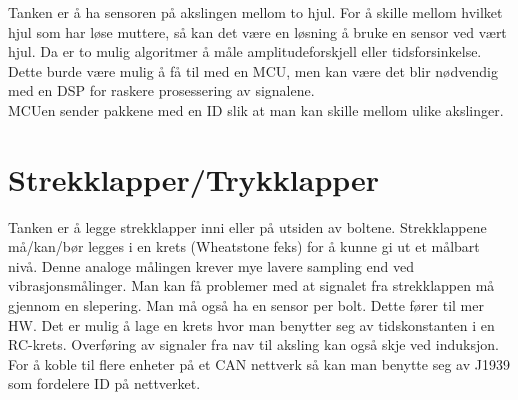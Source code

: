 Tanken er å ha sensoren på akslingen mellom to hjul. For å skille mellom hvilket
hjul som har løse muttere, så kan det være en løsning å bruke en sensor ved vært
hjul. Da er to mulig algoritmer å måle amplitudeforskjell eller
tidsforsinkelse. Dette burde være mulig å få til med en MCU, men kan være det
blir nødvendig med en DSP for raskere prosessering av signalene. \\

MCUen sender pakkene med en ID slik at man kan skille mellom ulike akslinger.

\section{Strekklapper/Trykklapper}

Tanken er å legge strekklapper inni eller på utsiden av boltene. Strekklappene
må/kan/bør legges i en krets (Wheatstone feks) for å kunne gi ut et målbart
nivå. Denne analoge målingen krever mye lavere sampling end ved vibrasjonsmålinger.
Man kan få problemer med at signalet fra strekklappen må gjennom en slepering.
Man må også ha en sensor per bolt. Dette fører til mer HW. Det er mulig å lage
en krets hvor man benytter seg av tidskonstanten i en RC-krets. Overføring av
signaler fra nav til aksling kan også skje ved induksjon. For å koble til flere
enheter på et CAN nettverk så kan man benytte seg av J1939 som fordelere ID på
nettverket.

